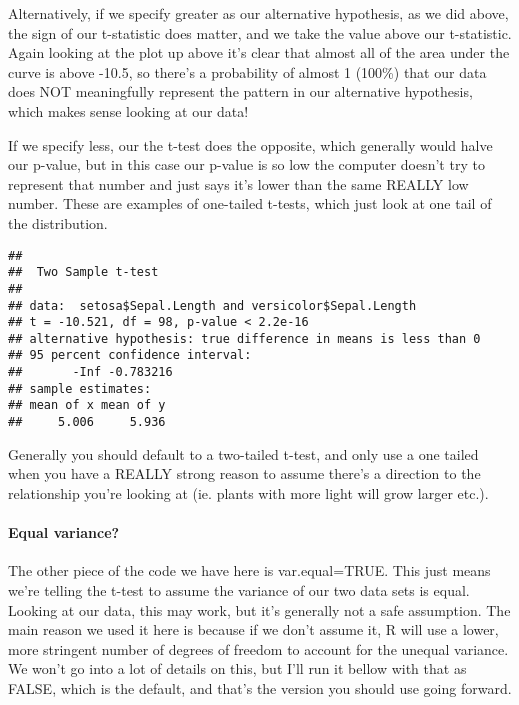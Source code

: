 \documentclass[
]{article}
\newenvironment{Shaded}{\begin{snugshade}}{\end{snugshade}}
\newcommand{\DataTypeTok}[1]{\textcolor[rgb]{0.13,0.29,0.53}{#1}}
\newcommand{\KeywordTok}[1]{\textcolor[rgb]{0.13,0.29,0.53}{\textbf{#1}}}
\newcommand{\NormalTok}[1]{#1}
\newcommand{\OperatorTok}[1]{\textcolor[rgb]{0.81,0.36,0.00}{\textbf{#1}}}
\newcommand{\OtherTok}[1]{\textcolor[rgb]{0.56,0.35,0.01}{#1}}
\newcommand{\StringTok}[1]{\textcolor[rgb]{0.31,0.60,0.02}{#1}}
\begin{document}
Alternatively, if we specify greater as our alternative hypothesis, as
we did above, the sign of our t-statistic does matter, and we take the
value above our t-statistic. Again looking at the plot up above it's
clear that almost all of the area under the curve is above -10.5, so
there's a probability of almost 1 (100\%) that our data does NOT
meaningfully represent the pattern in our alternative hypothesis, which
makes sense looking at our data!

If we specify less, our the t-test does the opposite, which generally
would halve our p-value, but in this case our p-value is so low the
computer doesn't try to represent that number and just says it's lower
than the same REALLY low number. These are examples of one-tailed
t-tests, which just look at one tail of the distribution.

\begin{Shaded}
\end{Shaded}

\begin{verbatim}
## 
##  Two Sample t-test
## 
## data:  setosa$Sepal.Length and versicolor$Sepal.Length
## t = -10.521, df = 98, p-value < 2.2e-16
## alternative hypothesis: true difference in means is less than 0
## 95 percent confidence interval:
##       -Inf -0.783216
## sample estimates:
## mean of x mean of y 
##     5.006     5.936
\end{verbatim}

Generally you should default to a two-tailed t-test, and only use a one
tailed when you have a REALLY strong reason to assume there's a
direction to the relationship you're looking at (ie. plants with more
light will grow larger etc.).

\hypertarget{equal-variance}{%
\paragraph{Equal variance?}\label{equal-variance}}

The other piece of the code we have here is var.equal=TRUE. This just
means we're telling the t-test to assume the variance of our two data
sets is equal. Looking at our data, this may work, but it's generally
not a safe assumption. The main reason we used it here is because if we
don't assume it, R will use a lower, more stringent number of degrees of
freedom to account for the unequal variance. We won't go into a lot of
details on this, but I'll run it bellow with that as FALSE, which is the
default, and that's the version you should use going forward.
\end{document}
